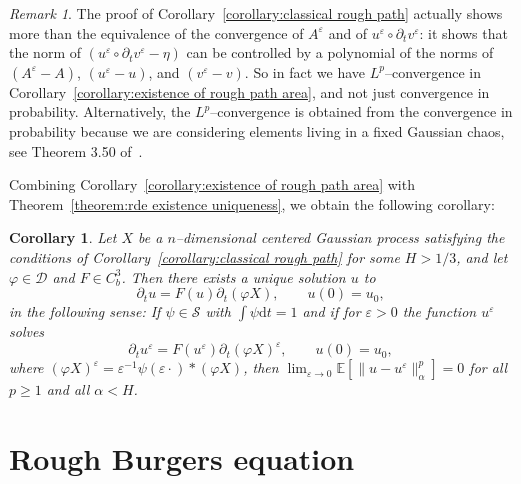 \documentclass[11pt,a4paper]{article}
\newcommand{\mathd}{\mathrm{d}}
\newtheorem{corollary}[theorem]{Corollary}
\theoremstyle{remark}
\newtheorem{remark}[theorem]{Remark}
\newcommand{\E}{\mathbb{E}}
\newcommand{\CD}{\ensuremath{\mathscr{D}}}
\newcommand{\CS}{\ensuremath{\mathscr{S}}}
\begin{document}
\begin{remark}
  The proof of Corollary~\ref{corollary:classical rough path} actually shows
  more than the equivalence of the convergence of $A^{\varepsilon}$ and of
  $u^{\varepsilon} \circ \partial_{t} v^{\varepsilon}$: it shows that the norm
  of $( u^{\varepsilon} \circ \partial_{t} v^{\varepsilon} - \eta )$ can be
  controlled by a polynomial of the norms of $( A^{\varepsilon} -A )$, $(u^{\varepsilon} -u )$, and $(v^{\varepsilon} -v)$. So in fact we
  have $L^{p}$--convergence in Corollary~\ref{corollary:existence of rough path area}, and not just convergence in probability. Alternatively, the $L^p$--convergence is obtained from the convergence in probability because we are considering elements living in a fixed Gaussian chaos, see Theorem 3.50 of~\cite{Janson1997}.
\end{remark}

Combining Corollary~\ref{corollary:existence of rough path area} with Theorem~\ref{theorem:rde existence uniqueness}, we obtain the following corollary:

\begin{corollary}
  Let $X$ be a $n$--dimensional centered Gaussian process satisfying the conditions of Corollary~\ref{corollary:classical rough path} for some $H > 1/3$, and let $\varphi \in \CD$ and $F \in C^3_b$. Then there exists a unique solution $u$ to
  \[
     \partial_t u = F(u) \partial_t (\varphi X), \qquad u(0) = u_0,
  \]
  in the following sense: If $\psi \in \CS$ with $\int \psi \mathd t=1$ and if for $\varepsilon > 0$ the function $u^\varepsilon$ solves
  \[
     \partial_t u^\varepsilon = F(u^\varepsilon) \partial_t (\varphi X)^\varepsilon, \qquad u(0) = u_0,
  \]
  where $(\varphi X)^\varepsilon = \varepsilon^{-1} \psi(\varepsilon \cdot) \ast (\varphi X)$, then $\lim_{\varepsilon \rightarrow 0} \E[\| u - u^\varepsilon \|_{\alpha}^p] = 0$ for all $p \ge 1$ and all $\alpha < H$.
\end{corollary}


\section{Rough Burgers equation}\label{sec:burgers}
\end{document}
